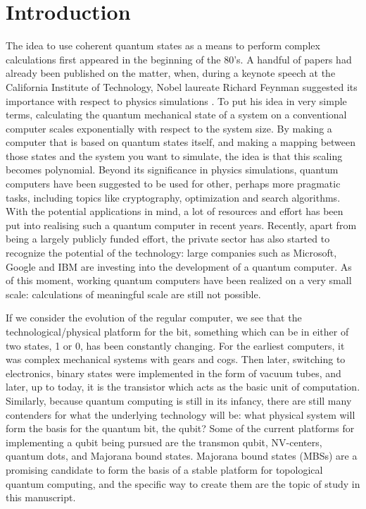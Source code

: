 \chapter{Introduction}

	The idea to use coherent quantum states as a means to perform complex calculations first appeared in the beginning of the 80's.
	A handful of papers had already been published on the matter, when, during a keynote speech\cite{feynman_simulating_1982} at the California Institute of Technology, Nobel laureate Richard Feynman suggested its importance with respect to physics simulations .
	To put his idea in very simple terms, calculating the quantum mechanical state of a system on a conventional computer scales exponentially with respect to the system size.
	By making a computer that is based on quantum states itself, and making a mapping between those states and the system you want to simulate, the idea is that this scaling becomes polynomial.
	Beyond its significance in physics simulations, quantum computers have been suggested to be used for other, perhaps more pragmatic tasks, including topics like cryptography, optimization and search algorithms.
	With the potential applications in mind, a lot of resources and effort has been put into realising such a quantum computer in recent years.
	Recently, apart from being a largely publicly funded effort, the private sector has also started to recognize the potential of the technology: large companies such as Microsoft\cite{noauthor_why_nodate}, Google\cite{noauthor_quantum_nodate} and IBM\cite{noauthor_ibm_2018} are investing into the development of a quantum computer.
	As of this moment, working quantum computers have been realized on a very small scale: calculations of meaningful scale are still not possible.

	If we consider the evolution of the regular computer, we see that the technological/physical platform for the bit, something which can be in either of two states, 1 or 0, has been constantly changing.
	For the earliest computers, it was complex mechanical systems with gears and cogs.
	Then later, switching to electronics, binary states were implemented in the form of vacuum tubes, and later, up to today, it is the transistor which acts as the basic unit of computation.
	Similarly, because quantum computing is still in its infancy, there are still many contenders for what the underlying technology will be: what physical system will form the basis for the quantum bit, the qubit?
	Some of the current platforms for implementing a qubit being pursued are the transmon qubit\cite{wendin_quantum_2017}, NV-centers\cite{childress_diamond_2013}, quantum dots\cite{kloeffel_prospects_2013}, and Majorana bound states\cite{wendin_quantum_2017}.
	Majorana bound states (MBSs) are a promising candidate to form the basis of a stable platform for topological quantum computing, and the specific way to create them are the topic of study in this manuscript.

